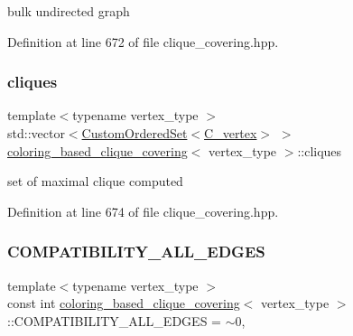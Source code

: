 bulk undirected graph 



Definition at line 672 of file clique\+\_\+covering.\+hpp.

\mbox{\label{classcoloring__based__clique__covering_a95e53460db9f21e63f447099e2a54d38}} 
\subsubsection{\texorpdfstring{cliques}{cliques}}
{\footnotesize\ttfamily template$<$typename vertex\+\_\+type $>$ \\
std\+::vector$<$\hyperlink{classCustomOrderedSet}{Custom\+Ordered\+Set}$<$\hyperlink{clique__covering__graph_8hpp_a9cb45047ea8c5ed95a8cfa90494345aa}{C\+\_\+vertex}$>$ $>$ \hyperlink{classcoloring__based__clique__covering}{coloring\+\_\+based\+\_\+clique\+\_\+covering}$<$ vertex\+\_\+type $>$\+::cliques\hspace{0.3cm}{\ttfamily [private]}}



set of maximal clique computed 



Definition at line 674 of file clique\+\_\+covering.\+hpp.

\mbox{\label{classcoloring__based__clique__covering_aee1762a1d6fc72923106948b08c18dc6}} 
\subsubsection{\texorpdfstring{C\+O\+M\+P\+A\+T\+I\+B\+I\+L\+I\+T\+Y\+\_\+\+A\+L\+L\+\_\+\+E\+D\+G\+ES}{COMPATIBILITY\_ALL\_EDGES}}
{\footnotesize\ttfamily template$<$typename vertex\+\_\+type $>$ \\
const int \hyperlink{classcoloring__based__clique__covering}{coloring\+\_\+based\+\_\+clique\+\_\+covering}$<$ vertex\+\_\+type $>$\+::C\+O\+M\+P\+A\+T\+I\+B\+I\+L\+I\+T\+Y\+\_\+\+A\+L\+L\+\_\+\+E\+D\+G\+ES = $\sim$0\hspace{0.3cm}{\ttfamily [static]}, {\ttfamily [private]}}



